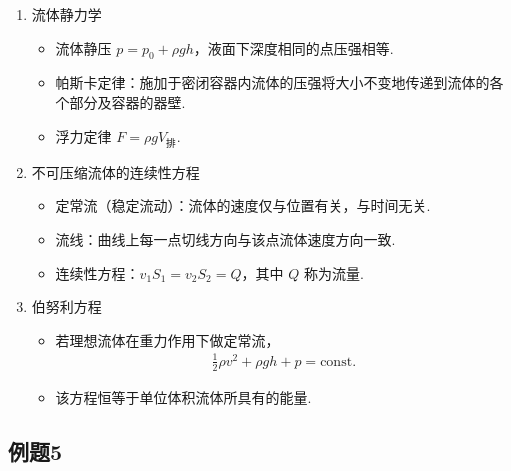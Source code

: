\begin{enumerate}
	\item 流体静力学
	\begin{itemize}
		\item 流体静压 $p = p_0 + \rho g h$，液面下深度相同的点压强相等.
		\item 帕斯卡定律：施加于密闭容器内流体的压强将大小不变地传递到流体的各个部分及容器的器壁.
		\item 浮力定律 $F = \rho g V_{\mathrm{排}}$.
		
	\end{itemize}
	
	\item 不可压缩流体的连续性方程
	
	\begin{itemize}
		\item 定常流（稳定流动）：流体的速度仅与位置有关，与时间无关.
		\item 流线：曲线上每一点切线方向与该点流体速度方向一致.
		\item 连续性方程：\(v_1 S_1 = v_2 S_2 = Q\)，其中 \(Q\) 称为流量.
	\end{itemize}
	
	\item 伯努利方程
	
	\begin{itemize}
		\item 若理想流体在重力作用下做定常流，
		\begin{align*}
			\frac{1}{2}\rho v^2 + \rho g h + p = \mathrm{const}.
		\end{align*}
		\item 该方程恒等于单位体积流体所具有的能量.
	\end{itemize}
	
	
\end{enumerate}

\newpage
\subsection{例题5}

